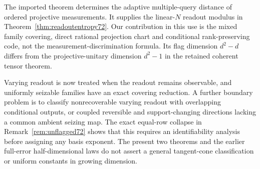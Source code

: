 The imported theorem \cite[Corollary~1 and Theorem~2]{PPKKO72}
determines the adaptive multiple-query distance of ordered projective
measurements. It supplies the linear-$N$ readout modulus in
Theorem~\ref{thm:readoutentropy72}. Our contribution in this use is the
mixed family covering, direct rational projection chart and conditional
rank-preserving code, not the measurement-discrimination formula.
Its flag dimension $d^2-d$ differs from the projective-unitary dimension
$d^2-1$ in the retained coherent tensor theorem.

Varying readout is now treated when the readout remains observable,
and uniformly seizable families have an exact covering reduction.
A further boundary problem is to classify nonrecoverable varying
readout with overlapping conditional outputs, or coupled reversible
and support-changing directions lacking a common ambient seizing map.
The exact equal-row collapse in Remark~\ref{rem:unflagged72} shows
that this requires an identifiability analysis before assigning any
basis exponent. The present two theorems and the earlier full-error
half-dimensional laws do not assert a general tangent-cone classification
or uniform constants in growing dimension.
